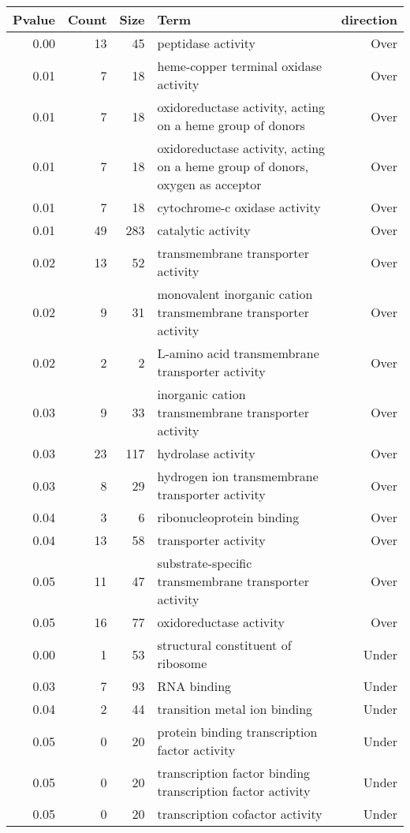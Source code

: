 \documentclass[10pt]{bmc_article}
\newenvironment{bmcformat}{\begin{raggedright}\baselineskip20pt\sloppy\setboolean{publ}{false}}{\end{raggedright}\baselineskip20pt\sloppy}
\begin{document}
\begin{bmcformat}
\begin{longtable}{rrrp{7cm}r}
 Pvalue & Count & Size & Term & direction \\ 
  \hline
0.00 &  13 &  45 & peptidase activity & Over \\ 
  0.01 &   7 &  18 & heme-copper terminal oxidase activity & Over \\ 
  0.01 &   7 &  18 & oxidoreductase activity, acting on a heme group of donors & Over \\ 
  0.01 &   7 &  18 & oxidoreductase activity, acting on a heme group of donors, oxygen as acceptor & Over \\ 
  0.01 &   7 &  18 & cytochrome-c oxidase activity & Over \\ 
  0.01 &  49 & 283 & catalytic activity & Over \\ 
  0.02 &  13 &  52 & transmembrane transporter activity & Over \\ 
  0.02 &   9 &  31 & monovalent inorganic cation transmembrane transporter activity & Over \\ 
  0.02 &   2 &   2 & L-amino acid transmembrane transporter activity & Over \\ 
  0.03 &   9 &  33 & inorganic cation transmembrane transporter activity & Over \\ 
  0.03 &  23 & 117 & hydrolase activity & Over \\ 
  0.03 &   8 &  29 & hydrogen ion transmembrane transporter activity & Over \\ 
  0.04 &   3 &   6 & ribonucleoprotein binding & Over \\ 
  0.04 &  13 &  58 & transporter activity & Over \\ 
  0.05 &  11 &  47 & substrate-specific transmembrane transporter activity & Over \\ 
  0.05 &  16 &  77 & oxidoreductase activity & Over \\ 
  0.00 &   1 &  53 & structural constituent of ribosome & Under \\ 
  0.03 &   7 &  93 & RNA binding & Under \\ 
  0.04 &   2 &  44 & transition metal ion binding & Under \\ 
  0.05 &   0 &  20 & protein binding transcription factor activity & Under \\ 
  0.05 &   0 &  20 & transcription factor binding transcription factor activity & Under \\ 
  0.05 &   0 &  20 & transcription cofactor activity & Under \\ 

\end{longtable}
\end{bmcformat}
\end{document}
